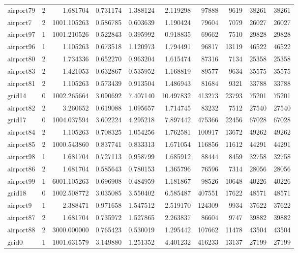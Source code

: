 \begin{longtable}{|l|r|r|r|r|r|r|r|r|r|}
airport79 & 2 & 1.681704 & 0.731174 & 1.388124 & 2.119298 & 97888 & 9619 & 38261 & 38261 \\
airport7 & 2 & 1001.105263 & 0.586785 & 0.603639 & 1.190424 & 79604 & 7079 & 26027 & 26027 \\
airport97 & 1 & 1001.210526 & 0.522843 & 0.395992 & 0.918835 & 69662 & 7510 & 29828 & 29828 \\
airport96 & 1 & 1.105263 & 0.673518 & 1.120973 & 1.794491 & 96817 & 13119 & 46522 & 46522 \\
airport80 & 2 & 1.734336 & 0.652270 & 0.963204 & 1.615474 & 87316 & 7134 & 25358 & 25358 \\
airport83 & 2 & 1.421053 & 0.632867 & 0.535952 & 1.168819 & 89577 & 9634 & 35575 & 35575 \\
airport81 & 2 & 1.105263 & 0.573439 & 0.913504 & 1.486943 & 81684 & 9321 & 33788 & 33788 \\
grid14 & 0 & 1002.265664 & 3.090692 & 7.407140 & 10.497832 & 413273 & 23793 & 75201 & 75201 \\
airport82 & 2 & 3.260652 & 0.619088 & 1.095657 & 1.714745 & 83232 & 7512 & 27540 & 27540 \\
grid17 & 0 & 1004.037594 & 3.602224 & 4.295218 & 7.897442 & 475366 & 22456 & 67028 & 67028 \\
airport84 & 2 & 1.105263 & 0.708325 & 1.054256 & 1.762581 & 100917 & 13672 & 49262 & 49262 \\
airport85 & 2 & 1000.543860 & 0.837741 & 0.833313 & 1.671054 & 116856 & 11612 & 44291 & 44291 \\
airport98 & 1 & 1.681704 & 0.727113 & 0.958799 & 1.685912 & 88444 & 8459 & 32758 & 32758 \\
airport86 & 2 & 1.681704 & 0.585643 & 0.780153 & 1.365796 & 76596 & 7314 & 28056 & 28056 \\
airport99 & 1 & 6001.105263 & 0.696908 & 0.484959 & 1.181867 & 98526 & 10648 & 40226 & 40226 \\
grid18 & 0 & 1002.508772 & 3.035085 & 3.550402 & 6.585487 & 407551 & 17622 & 48571 & 48571 \\
airport9 & 1 & 2.388471 & 0.971658 & 1.547512 & 2.519170 & 124309 & 9934 & 37622 & 37622 \\
airport87 & 2 & 1.681704 & 0.735972 & 1.527865 & 2.263837 & 86604 & 9747 & 39882 & 39882 \\
airport88 & 2 & 3000.000000 & 0.765423 & 0.530019 & 1.295442 & 107662 & 11478 & 43504 & 43504 \\
grid0 & 1 & 1001.631579 & 3.149880 & 1.251352 & 4.401232 & 416233 & 13137 & 27199 & 27199 \\

\end{longtable}
